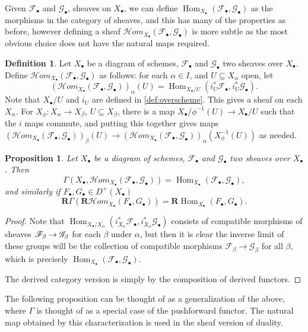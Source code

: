 \documentclass[proquest]{uwthesis}[2014/11/13]
\newtheorem{prop}[theorem]{Proposition}
\theoremstyle{definition}
\newtheorem{definition}[theorem]{Definition}
\DeclareMathOperator{\Hom}{Hom}
\newcommand{\cHom}{\mathcal{H} \textit{om}}
\newcommand{\FF}{\mathscr{F}}
\newcommand{\GG}{\mathscr{G}}
\newcommand{\bR}{\textbf{R}}
\begin{document}
Given $\FF_\bullet$ and $\GG_\bullet$, sheaves on $X_\bullet$, we can define $\Hom_{X_\bullet}(\FF_\bullet, \GG_\bullet)$ as the morphisms in the category of sheaves, and this has many of the properties as before, however defining a sheaf $\cHom_{X_\bullet}(\FF_\bullet, \GG_\bullet)$ is more subtle as the most obvious choice does not have the natural maps required.
\begin{definition}
	Let $X_\bullet$ be a diagram of schemes, $\FF_\bullet$ and $\GG_\bullet$ two sheaves over $X_\bullet$.
	Define $\cHom_{X_\bullet}(\FF_\bullet, \GG_\bullet)$ as follows: for each $\alpha \in I$, and $U \subseteq X_\alpha$ open, let
	\[
	(\cHom_{X_\bullet}(\FF_\bullet, \GG_\bullet))_\alpha(U) = \Hom_{X_\bullet/U} ( i_U^* \FF_\bullet , i_U^* \GG_\bullet).
	\]
	Note that $X_\bullet/U$ and $i_U$ are defined in \ref{def:overscheme}. This gives a sheaf on each $X_\alpha$.
	For $X_\phi : X_\alpha \rightarrow X_\beta$, $U \subseteq X_\beta$, there is a map $X_\bullet / \phi^{-1}(U) \rightarrow X_\bullet / U$ such that the $i$ maps commute, and putting this together gives maps $(\cHom_{X_\bullet}(\FF_\bullet, \GG_\bullet))_\beta(U) \rightarrow (\cHom_{X_\bullet}(\FF_\bullet, \GG_\bullet))_\alpha(X_\phi^{-1}(U))$ as needed.
\end{definition}

\begin{prop}
	Let $X_\bullet$ be a diagram of schemes, $\FF_\bullet$ and $\GG_\bullet$ two sheaves over $X_\bullet$.
	Then
	\[
	\Gamma(X_\bullet, \cHom_{X_\bullet}(\FF_\bullet, \GG_\bullet)) = \Hom_{X_\bullet}(\FF_\bullet, \GG_\bullet),
	\]
	and similarly if $F_\bullet, G_\bullet \in D^+(X_\bullet)$
	\[
	\bR \Gamma (\bR \cHom_{X_\bullet}(F_\bullet, G_\bullet)) = \bR \Hom_{X_\bullet}(F_\bullet, G_\bullet).
	\]
\end{prop}
\begin{proof}
	Note that $ \Hom_{X_\bullet / X_\alpha} ( i_{X_\alpha}^* \FF_\bullet , i_{X_\alpha}^* \GG_\bullet)$ consists of compatible morphisms of sheaves $\FF_\beta \rightarrow\nobreak \GG_\beta$ for each $\beta$ under $\alpha$, but then it is clear the inverse limit of these groups will be the collection of compatible morphisms $\FF_\beta \rightarrow \GG_\beta$ for all $\beta$, which is precisely $\Hom_{X_\bullet}(\FF_\bullet, \GG_\bullet)$.
	
	The derived category version is simply by the composition of derived functors.
\end{proof}

The following proposition can be thought of as a generalization of the above, where $\Gamma$ is thought of as a special case of the pushforward functor. 
The natural map obtained by this characterization is used in the sheaf version of duality.
\end{document}
